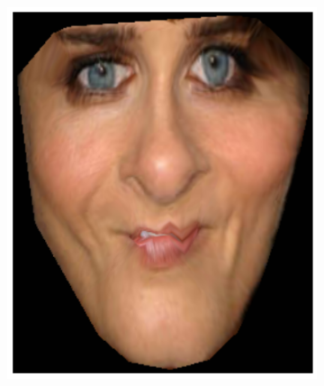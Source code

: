 \begin{figure}[h!]
\begin{subfigure}[b]{0.12\textwidth}
    \end{subfigure}
   	\hfill
    \begin{subfigure}[b]{0.1\textwidth}
            \includegraphics[width=\textwidth]{resources/Fig_Draw/test_01_aam}
    \end{subfigure}
    \hfill
    \begin{subfigure}[b]{0.1\textwidth}

\end{subfigure}
\end{figure}
